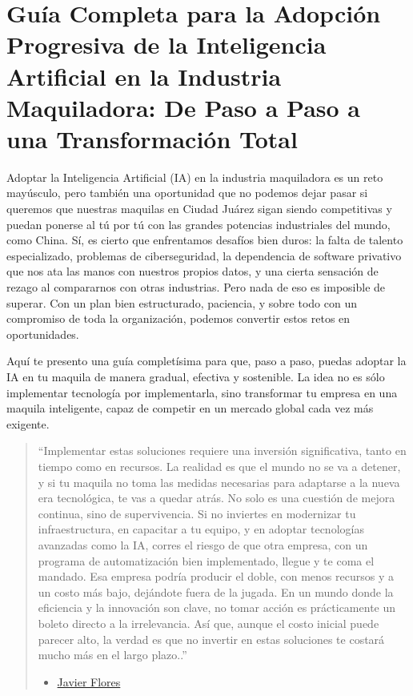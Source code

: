 \documentclass[
  letterpaper,
]{book}
\providecommand{\tightlist}{%
  \setlength{\itemsep}{0pt}\setlength{\parskip}{0pt}}\usepackage{longtable,booktabs,array}
\begin{document}
\section{Guía Completa para la Adopción Progresiva de la Inteligencia
Artificial en la Industria Maquiladora: De Paso a Paso a una
Transformación
Total}\label{guuxeda-completa-para-la-adopciuxf3n-progresiva-de-la-inteligencia-artificial-en-la-industria-maquiladora-de-paso-a-paso-a-una-transformaciuxf3n-total}

Adoptar la Inteligencia Artificial (IA) en la industria maquiladora es
un reto mayúsculo, pero también una oportunidad que no podemos dejar
pasar si queremos que nuestras maquilas en Ciudad Juárez sigan siendo
competitivas y puedan ponerse al tú por tú con las grandes potencias
industriales del mundo, como China. Sí, es cierto que enfrentamos
desafíos bien duros: la falta de talento especializado, problemas de
ciberseguridad, la dependencia de software privativo que nos ata las
manos con nuestros propios datos, y una cierta sensación de rezago al
compararnos con otras industrias. Pero nada de eso es imposible de
superar. Con un plan bien estructurado, paciencia, y sobre todo con un
compromiso de toda la organización, podemos convertir estos retos en
oportunidades.

Aquí te presento una guía completísima para que, paso a paso, puedas
adoptar la IA en tu maquila de manera gradual, efectiva y sostenible. La
idea no es sólo implementar tecnología por implementarla, sino
transformar tu empresa en una maquila inteligente, capaz de competir en
un mercado global cada vez más exigente.

\begin{quote}
``Implementar estas soluciones requiere una inversión significativa,
tanto en tiempo como en recursos. La realidad es que el mundo no se va a
detener, y si tu maquila no toma las medidas necesarias para adaptarse a
la nueva era tecnológica, te vas a quedar atrás. No solo es una cuestión
de mejora continua, sino de supervivencia. Si no inviertes en modernizar
tu infraestructura, en capacitar a tu equipo, y en adoptar tecnologías
avanzadas como la IA, corres el riesgo de que otra empresa, con un
programa de automatización bien implementado, llegue y te coma el
mandado. Esa empresa podría producir el doble, con menos recursos y a un
costo más bajo, dejándote fuera de la jugada. En un mundo donde la
eficiencia y la innovación son clave, no tomar acción es prácticamente
un boleto directo a la irrelevancia. Así que, aunque el costo inicial
puede parecer alto, la verdad es que no invertir en estas soluciones te
costará mucho más en el largo plazo..''

\begin{itemize}
\tightlist
\item
  \href{https://twitter.com/xavierflorex2}{Javier Flores}
\end{itemize}
\end{quote}
\end{document}
